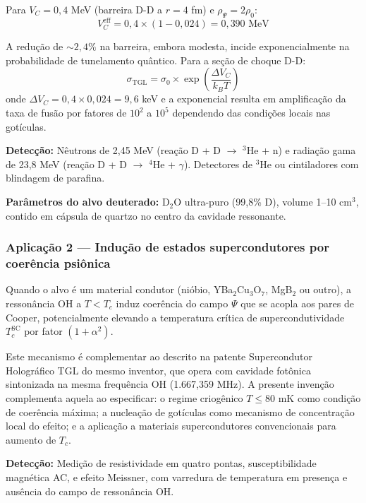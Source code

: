\documentclass[12pt,a4paper]{article}
\newcommand{\alphaii}{\alpha^2}
\newcommand{\rhoPsi}{\rho_\Psi}
\newcommand{\Tcrit}{T_c}
\begin{document}
Para $V_C = 0{,}4$ MeV (barreira D-D a $r = 4$ fm) e
$\rhoPsi = 2\rho_0$:
\begin{equation}
V_C^{\text{eff}} = 0{,}4 \times (1 - 0{,}024)
  = 0{,}390 \text{ MeV}
\end{equation}

A redução de $\sim 2{,}4\%$ na barreira, embora modesta,
incide exponencialmente na probabilidade de tunelamento
quântico. Para a seção de choque D-D:
\begin{equation}
\sigma_{\text{TGL}} = \sigma_0 \times
  \exp\left(\frac{\Delta V_C}{k_B T}\right)
\end{equation}
onde $\Delta V_C = 0{,}4 \times 0{,}024 = 9{,}6$ keV e a
exponencial resulta em amplificação da taxa de fusão por
fatores de $10^2$ a $10^5$ dependendo das condições locais
nas gotículas.

\textbf{Detecção:} Nêutrons de 2,45 MeV (reação
D + D $\to$ $^3$He + n) e radiação gama de 23,8 MeV
(reação D + D $\to$ $^4$He + $\gamma$). Detectores de
$^3$He ou cintiladores com blindagem de parafina.

\textbf{Parâmetros do alvo deuterado:} D$_2$O ultra-puro
(99,8\% D), volume 1--10 cm$^3$, contido em cápsula de
quartzo no centro da cavidade ressonante.

\subsubsection{Aplicação 2 --- Indução de estados
supercondutores por coerência psiônica}

Quando o alvo é um material condutor (nióbio, YBa$_2$Cu$_3$O$_7$,
MgB$_2$ ou outro), a ressonância OH a $T < \Tcrit$ induz
coerência do campo $\Psi$ que se acopla aos pares de Cooper,
potencialmente elevando a temperatura crítica de
supercondutividade $T_c^{\text{SC}}$ por fator $(1 + \alphaii)$.

Este mecanismo é complementar ao descrito na patente
Supercondutor Holográfico TGL do mesmo inventor, que opera
com cavidade fotônica sintonizada na mesma frequência OH
(1.667,359 MHz). A presente invenção complementa aquela
ao especificar: o regime criogênico $T \leq 80$ mK como
condição de coerência máxima; a nucleação de gotículas como
mecanismo de concentração local do efeito; e a aplicação a
materiais supercondutores convencionais para aumento de $T_c$.

\textbf{Detecção:} Medição de resistividade em quatro pontas,
susceptibilidade magnética AC, e efeito Meissner, com varredura
de temperatura em presença e ausência do campo de ressonância
OH.
\end{document}
